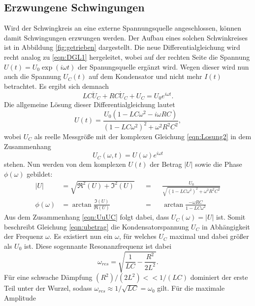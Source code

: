 \subsection{Erzwungene Schwingungen}
Wird der Schwingkreis an eine externe Spannungsquelle angeschlossen, können damit Schwingungen erzwungen werden. Der Aufbau eines solchen Schwinkreises
ist in Abbildung \ref{fig:getrieben} dargestellt. Die neue Differentialgleichung wird recht analog zu \eqref{eqn:DGL1} hergeleitet, wobei auf der 
rechten Seite die Spannung $U(t)=U_0\exp(i\omega t)$ der Spanungsquelle ergänzt wird. Wegen dieser wird nun auch die Spannung $U_C(t)$ auf dem Kondensator
und nicht mehr $I(t)$ betrachtet. Es ergibt sich demnach
\begin{equation*}
    LC\ddot{U}_C+RC\dot{U}_C+U_C=U_0e^{i\omega t}   .
    \label{eqn:DGL2}
\end{equation*}
Die allgemeine Lösung dieser Differentialgleichung lautet
\begin{equation}
    U(t)=\frac{U_0(1-LC\omega^2-i\omega RC)}{(1-LC\omega^2)^2+\omega^2R^2C^2}   ,
    \label{eqn:Losung2}
\end{equation}
wobei $U_C$ als reelle Messgröße mit der komplexen Gleichung \eqref{eqn:Losung2} in dem Zusammenhang
\begin{equation}
    U_C(\omega,t)=U(\omega)e^{i\omega t} 
    \label{eqn:UuUC}
\end{equation} 
stehen. Nun werden von dem komplexen $U(t)$ der Betrag $|U|$ sowie die Phase $\phi(\omega)$ gebildet:
\begin{align} %
    |U|          &= \sqrt{\Re^2(U)+\Im^2(U)}      & &=& &\frac{U_0}{\sqrt{(1-LC\omega^2)^2+\omega^2R^2C^2}} \label{eqn:ubetrag} \\
    \phi(\omega) &= \arctan{\frac{\Im(U)}{\Re(U)}}& &=& &\arctan{\frac{-\omega RC}{1-LC\omega^2}} \label{eqn:uphase}
\end{align}
Aus dem Zusammenhang \eqref{eqn:UuUC} folgt dabei, dass $U_C(\omega)=|U|$ ist. Somit beschreibt Gleichung \eqref{eqn:ubetrag} die Kondensatorspannung
$U_C$ in Abhängigkeit der Frequenz $\omega$. Es existiert nun ein $\omega$, für welches $U_C$ maximal und dabei größer als $U_0$ ist. Diese 
sogennante Resonanzfrequenz ist dabei 
\begin{equation*}
    \omega_{res}=\sqrt{\frac{1}{LC}-\frac{R^2}{2L^2}}   .
\end{equation*}
Für eine schwache Dämpfung $(R^2)/(2L^2)<<1/(LC)$ dominiert der erste Teil unter der Wurzel, sodass $\omega_{res}\approx 1/\sqrt{LC}=\omega_0$ gilt. Für die maximale Amplitude
